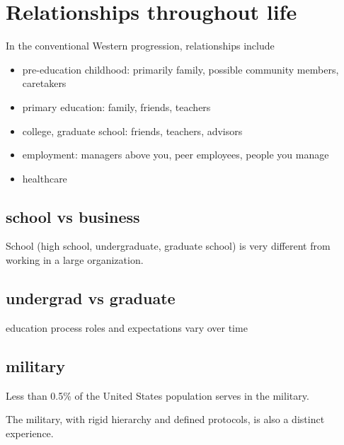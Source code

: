 \section{Relationships throughout life}
In the conventional Western progression, relationships include
\begin{itemize}
    \item pre-education childhood: primarily family, possible community members, caretakers
    \item primary education: family, friends, teachers
    \item college, graduate school: friends, teachers, advisors
    \item employment: managers above you, peer employees, people you manage
    \item healthcare
\end{itemize}

\subsection{school vs business}
School (high school, undergraduate, graduate school) is very different from working in a large organization. 


\subsection{undergrad vs graduate}
 education process roles and expectations vary over time

\subsection{military}
Less than 0.5\% of the United States population serves in the military. 

The military, with rigid hierarchy and defined protocols, is also a distinct experience. 
